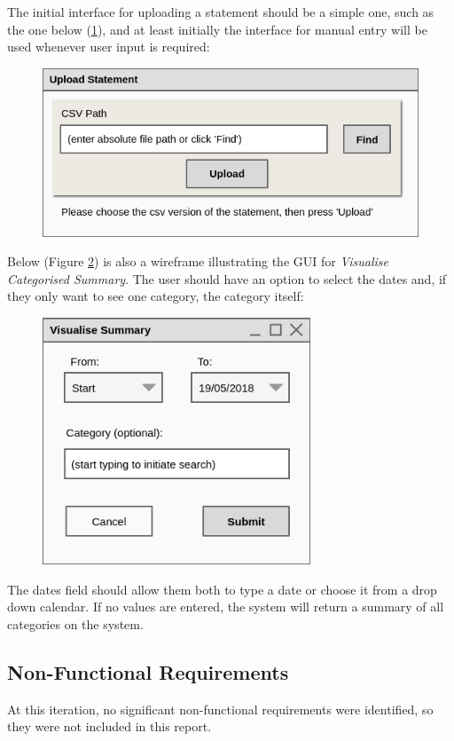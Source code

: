 The initial interface for uploading a statement should be a simple one, such as
the one below
(\ref{fig:Wireframe.UploadStatement}), and at least initially the interface for
manual entry will be used whenever user input is required:
\begin{figure}[ht!]
  \begin{center}
    \includegraphics[width=12cm]{./contents/img/Wireframe_-_Upload_Statement.png}
  \end{center}
  \caption{}
  \label{fig:Wireframe.UploadStatement}
\end{figure}
\FloatBarrier

Below (Figure \ref{fig:Wireframe.VisualiseCategorisedSummary}) is also a
wireframe illustrating the GUI for \emph{Visualise Categorised Summary}. The
user should have an option to select the dates and, if they only want to see
one category, the category itself:
\begin{figure}[ht!]
  \begin{center}
    \includegraphics[width=8cm]{./contents/img/Wireframe_-_Visualise_Summary.png}
  \end{center}
  \caption{}
  \label{fig:Wireframe.VisualiseCategorisedSummary}
\end{figure}
\FloatBarrier

The dates field should allow them both to type a date or choose it from a drop
down calendar. If no values are entered, the system will return a summary of
all categories on the system.


\subsection{Non-Functional Requirements} \label{sec:Requirements.NonFunctionalRequirements}
At this iteration, no significant non-functional requirements were identified,
so they were not included in this report.
